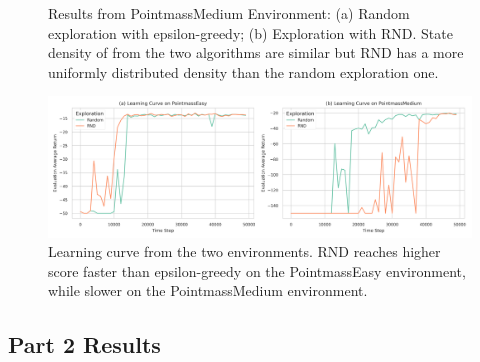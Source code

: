 \documentclass[10pt, letterpaper]{article}
\begin{document}
\begin{figure}[h!]
    \centering
    \caption{Results from PointmassMedium Environment: (a) Random exploration with epsilon-greedy; (b) Exploration with RND. State density of from the two algorithms are similar but RND has a more uniformly distributed density than the random exploration one.}
    \label{fig:2}
\end{figure}

\begin{figure}[h!]
    \centering
    \includegraphics[width=\textwidth]{q1_learning_curve.png}
    \caption{Learning curve from the two environments. RND reaches higher score faster than epsilon-greedy on the PointmassEasy environment, while slower on the PointmassMedium environment.}
    \label{fig: 3}
\end{figure}

\subsection*{Part 2 Results}
\end{document}
